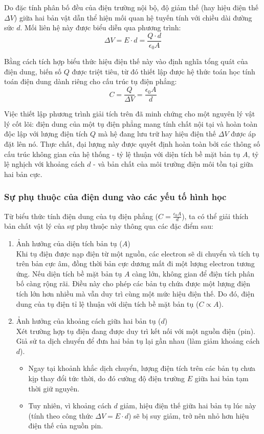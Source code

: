 Do đặc tính phân bố đều của điện trường nội bộ, độ giảm thế (hay hiệu điện thế $\Delta V$) giữa hai bản vật dẫn thể hiện mối quan hệ tuyến tính với chiều dài đường sức $d$. Mối liên hệ này được biểu diễn qua phương trình:
$$\Delta V = E \cdot d = \frac{Q \cdot d}{\epsilon_0 A}$$

Bằng cách tích hợp biểu thức hiệu điện thế này vào định nghĩa tổng quát của điện dung, biến số $Q$ được triệt tiêu, từ đó thiết lập được hệ thức toán học tính toán điện dung dành riêng cho cấu trúc tụ điện phẳng:
$$C = \frac{Q}{\Delta V} = \frac{\epsilon_0 A}{d}$$

Việc thiết lập phương trình giải tích trên đã minh chứng cho một nguyên lý vật lý cốt lõi: điện dung của một tụ điện phẳng mang tính chất nội tại và hoàn toàn độc lập với lượng điện tích $Q$ mà hệ đang lưu trữ hay hiệu điện thế $\Delta V$ được áp đặt lên nó. Thực chất, đại lượng này được quyết định hoàn toàn bởi các thông số cấu trúc không gian của hệ thống - tỷ lệ thuận với diện tích bề mặt bản tụ $A$, tỷ lệ nghịch với khoảng cách $d$ - và bản chất của môi trường điện môi tồn tại giữa hai bản cực.

\subsubsection{Sự phụ thuộc của điện dung vào các yếu tố hình học}
Từ biểu thức tính điện dung của tụ điện phẳng ($C = \frac{\epsilon_0 A}{d}$), ta có thể giải thích bản chất vật lý của sự phụ thuộc này thông qua các đặc điểm sau:
\begin{enumerate}
    \item Ảnh hưởng của diện tích bản tụ ($A$)\\
    Khi tụ điện được nạp điện từ một nguồn, các electron sẽ di chuyển và tích tụ trên bản cực âm, đồng thời bản cực dương mất đi một lượng electron tương ứng. Nếu diện tích bề mặt bản tụ $A$ càng lớn, không gian để điện tích phân bố càng rộng rãi. Điều này cho phép các bản tụ chứa được một lượng điện tích lớn hơn nhiều mà vẫn duy trì cùng một mức hiệu điện thế. Do đó, điện dung của tụ điện tỉ lệ thuận với diện tích bề mặt bản tụ ($C \propto A$).
    \item Ảnh hưởng của khoảng cách giữa hai bản tụ ($d$)\\
    Xét trường hợp tụ điện đang được duy trì kết nối với một nguồn điện (pin). Giả sử ta dịch chuyển để đưa hai bản tụ lại gần nhau (làm giảm khoảng cách $d$).
    \begin{itemize}
        \item Ngay tại khoảnh khắc dịch chuyển, lượng điện tích trên các bản tụ chưa kịp thay đổi tức thời, do đó cường độ điện trường $E$ giữa hai bản tạm thời giữ nguyên.
        \item Tuy nhiên, vì khoảng cách $d$ giảm, hiệu điện thế giữa hai bản tụ lúc này (tính theo công thức $\Delta V = E \cdot d$) sẽ bị suy giảm, trở nên nhỏ hơn hiệu điện thế của nguồn pin.
    \end{itemize}
\end{enumerate}

